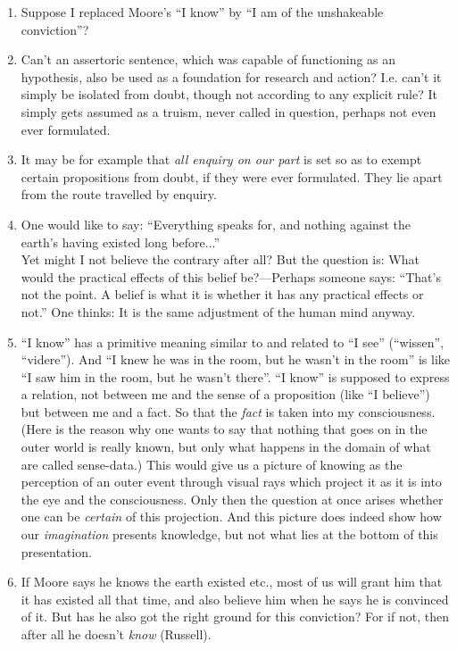 \documentclass{book}
\begin{document}
\begin{enumerate}
\item
Suppose I replaced Moore's ``I know'' by ``I am of the unshakeable
conviction''?

\item
Can't an assertoric sentence, which was capable of functioning as an
hypothesis, also be used as a foundation for research and action? I.e. can't it
simply be isolated from doubt, though not according to any explicit rule? It
simply gets assumed as a truism, never called in question, perhaps not even
ever formulated.

\item
It may be for example that \emph{all enquiry on our part} is set so as to
exempt certain propositions from doubt, if they were ever formulated. They lie
apart from the route travelled by enquiry.

\item
One would like to say: ``Everything speaks for, and nothing against the earth's
having existed long before...'' \\
Yet might I not believe the contrary after all?  But the question is: What
would the practical effects of this belief be?---Perhaps someone says: ``That's
not the point. A belief is what it is whether it has any practical effects or
not.'' One thinks: It is the same adjustment of the human mind anyway.

\item
``I know'' has a primitive meaning similar to and related to ``I see''
(``wissen'', ``videre''). And ``I knew he was in the room, but he wasn't in the
room'' is like ``I saw him in the room, but he wasn't there''. ``I know'' is
supposed to express a relation, not between me and the sense of a proposition
(like ``I believe'') but between me and a fact. So that the \emph{fact} is
taken into my consciousness. (Here is the reason why one wants to say that
nothing that goes on in the outer world is really known, but only what happens
in the domain of what are called sense-data.) This would give us a picture of
knowing as the perception of an outer event through visual rays which project
it as it is into the eye and the consciousness. Only then the question at once
arises whether one can be \emph{certain} of this projection. And this picture
does indeed show how our \emph{imagination} presents knowledge, but not what
lies at the bottom of this presentation.

\item
If Moore says he knows the earth existed etc., most of us will grant him that
it has existed all that time, and also believe him when he says he is convinced
of it. But has he also got the right ground for this conviction? For if not,
then after all he doesn't \emph{know} (Russell).


\end{enumerate}
\end{document}
